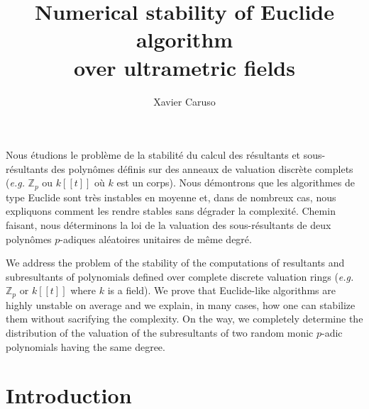 \documentclass{jT}
\numberwithin{equation}{section}
\theoremstyle{definition}
\newcommand{\Z}{\mathbb Z}
\newcommand{\Zp}{\Z_p}
\begin{document}
\title[Numerical stability of Euclide algorithm over ultrametric fields]
{Numerical stability of Euclide algorithm\\over ultrametric fields}

\author{Xavier Caruso}
\address{Xavier Caruso\\
Université Rennes 1, IRMAR, 35042 Rennes Cedex\\
France}



\maketitle

\begin{resume}
Nous étudions le problème de la stabilité du calcul des résultants et
sous-résultants des polynômes définis sur des anneaux de valuation
discrète complets (\emph{e.g.} $\Zp$ ou $k[[t]]$ où $k$ est un corps).
Nous démontrons que les algorithmes de type Euclide sont très instables
en moyenne et, dans de nombreux cas, nous expliquons comment les rendre
stables sans dégrader la complexité. Chemin faisant, nous déterminons
la loi de la valuation des sous-résultants de deux polynômes $p$-adiques
aléatoires unitaires de même degré.
\end{resume}

\begin{abstr}
We address the problem of the stability of the computations of resultants 
and subresultants of polynomials defined over complete discrete valuation 
rings (\emph{e.g.} $\Zp$ or $k[[t]]$ where $k$ is a field). We prove that 
Euclide-like algorithms are highly unstable on average and we explain, in
many cases, how one can stabilize them without sacrifying the complexity.
On the way, we completely determine the distribution of the valuation of
the subresultants of two random monic $p$-adic polynomials having the
same degree.
\end{abstr}

\section{Introduction}
\end{document}
